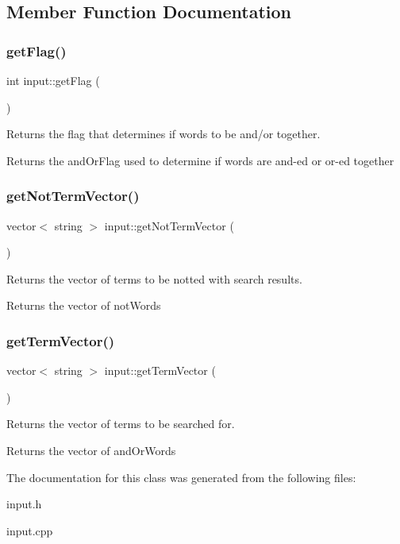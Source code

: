 \subsection{Member Function Documentation}
\mbox{\label{classinput_af8a7e9c56d11bd47067a1d6a04b97629}} 
\subsubsection{\texorpdfstring{get\+Flag()}{getFlag()}}
{\footnotesize\ttfamily int input\+::get\+Flag (\begin{DoxyParamCaption}{ }\end{DoxyParamCaption})}



Returns the flag that determines if words to be and/or together. 

\begin{DoxyReturn}{Returns}
the and\+Or\+Flag used to determine if words are and-\/ed or or-\/ed together 
\end{DoxyReturn}
\mbox{\label{classinput_ac4c7f5fae89a9f8a85e05027ef1aab0d}} 
\subsubsection{\texorpdfstring{get\+Not\+Term\+Vector()}{getNotTermVector()}}
{\footnotesize\ttfamily vector$<$ string $>$ input\+::get\+Not\+Term\+Vector (\begin{DoxyParamCaption}{ }\end{DoxyParamCaption})}



Returns the vector of terms to be notted with search results. 

\begin{DoxyReturn}{Returns}
the vector of not\+Words 
\end{DoxyReturn}
\mbox{\label{classinput_abc12997975bf5df011bbb073611225fa}} 
\subsubsection{\texorpdfstring{get\+Term\+Vector()}{getTermVector()}}
{\footnotesize\ttfamily vector$<$ string $>$ input\+::get\+Term\+Vector (\begin{DoxyParamCaption}{ }\end{DoxyParamCaption})}



Returns the vector of terms to be searched for. 

\begin{DoxyReturn}{Returns}
the vector of and\+Or\+Words 
\end{DoxyReturn}


The documentation for this class was generated from the following files\+:\begin{DoxyCompactItemize}
\item 
input.\+h\item 
input.\+cpp\end{DoxyCompactItemize}
